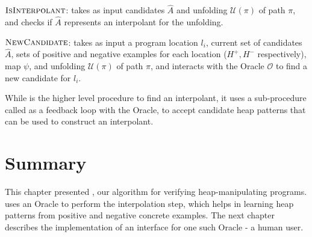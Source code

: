 \begin{algorithm}[ht]


  \caption{$\textsc{IsInterpolant}$: takes as input candidates $\hat{A}$ and unfolding $\mathcal{U}(\pi)$ of path $\pi$, and checks if $\hat{A}$ represents an interpolant for the unfolding.}
  \label{alg:isinterpolant}
\end{algorithm}

\begin{algorithm}[ht]


  \caption{$\textsc{NewCandidate}$: takes as input a program location $l_i$, current set of candidates $\hat{A}$, sets of positive and negative examples for each location ($H^{+}, H^{-}$ respectively), map $\psi$, and unfolding $\mathcal{U}(\pi)$ of path $\pi$, and interacts with the Oracle $\mathcal{O}$ to find a new candidate for $l_i$.}
  \label{alg:newcandidate}
\end{algorithm}

While \seplearner is the higher level procedure to find an interpolant, it uses a sub-procedure called \newcandidate as a feedback loop with the Oracle, to accept candidate heap patterns that can be used to construct an interpolant.

\section*{Summary}
This chapter presented \verifier, our algorithm for verifying heap-manipulating programs. \verifier uses an Oracle to perform the interpolation step, which helps in learning heap patterns from positive and negative concrete examples. The next chapter describes the implementation of an interface for one such Oracle - a human user.